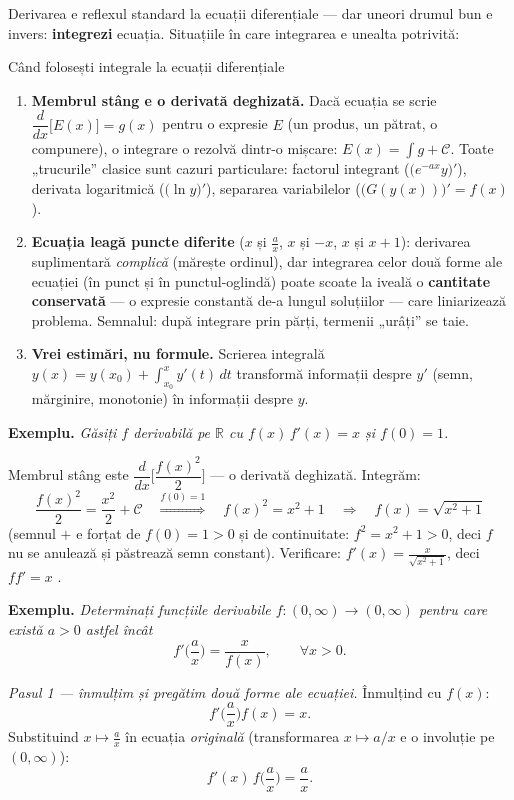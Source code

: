 Derivarea e reflexul standard la ecuații diferențiale — dar uneori drumul bun e invers: \textbf{integrezi} ecuația. Situațiile în care integrarea e unealta potrivită:

\begin{tehbox}{Când folosești integrale la ecuații diferențiale}
\begin{enumerate}[leftmargin=*, itemsep=1pt]
\item \textbf{Membrul stâng e o derivată deghizată.} Dacă ecuația se scrie $\dfrac{d}{dx}\big[E(x)\big]=g(x)$ pentru o expresie $E$ (un produs, un pătrat, o compunere), o integrare o rezolvă dintr-o mișcare: $E(x)=\int g+\mathcal C$. Toate „trucurile'' clasice sunt cazuri particulare: factorul integrant ($\big(e^{-ax}y\big)'$), derivata logaritmică ($\big(\ln y\big)'$), separarea variabilelor ($\big(G(y(x))\big)'=f(x)$).
\item \textbf{Ecuația leagă puncte diferite} ($x$ și $\frac ax$, $x$ și $-x$, $x$ și $x+1$): derivarea suplimentară \emph{complică} (mărește ordinul), dar integrarea celor două forme ale ecuației (în punct și în punctul-oglindă) poate scoate la iveală o \textbf{cantitate conservată} --- o expresie constantă de-a lungul soluțiilor --- care liniarizează problema. Semnalul: după integrare prin părți, termenii „urâți'' se taie.
\item \textbf{Vrei estimări, nu formule.} Scrierea integrală $y(x)=y(x_0)+\int_{x_0}^{x}y'(t)\,dt$ transformă informații despre $y'$ (semn, mărginire, monotonie) în informații despre $y$.
\end{enumerate}
\end{tehbox}

\textbf{Exemplu.} \emph{Găsiți $f$ derivabilă pe $\mathbb{R}$ cu $f(x)\,f'(x)=x$ și $f(0)=1$.}

Membrul stâng este $\dfrac{d}{dx}\Big[\dfrac{f(x)^2}{2}\Big]$ --- o derivată deghizată. Integrăm:
\[
\frac{f(x)^2}{2}=\frac{x^2}{2}+\mathcal C
\quad\overset{f(0)=1}{\Longrightarrow}\quad
f(x)^2=x^2+1
\quad\Longrightarrow\quad
f(x)=\sqrt{x^2+1}
\]
(semnul $+$ e forțat de $f(0)=1>0$ și de continuitate: $f^2=x^2+1>0$, deci $f$ nu se anulează și păstrează semn constant). Verificare: $f'(x)=\frac{x}{\sqrt{x^2+1}}$, deci $ff'=x$ \checkmark.

\medskip
\textbf{Exemplu.} \emph{Determinați funcțiile derivabile $f:(0,\infty)\to(0,\infty)$ pentru care există $a>0$ astfel încât}
\[
f'\Big(\frac ax\Big)=\frac{x}{f(x)},\qquad\forall x>0.
\]

\emph{Pasul 1 --- înmulțim și pregătim două forme ale ecuației.} Înmulțind cu $f(x)$:
\[
f'\Big(\frac ax\Big)f(x)=x. \tag{$*$}
\]
Substituind $x\mapsto\frac ax$ în ecuația \emph{originală} (transformarea $x\mapsto a/x$ e o involuție pe $(0,\infty)$):
\[
f'(x)\,f\Big(\frac ax\Big)=\frac ax. \tag{$**$}
\]

